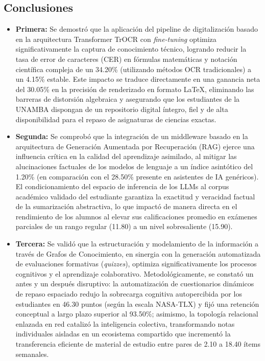 \subsection{Conclusiones}

\begin{itemize}

\item \textbf{Primera:} Se demostró que la aplicación del pipeline de digitalización basado en la arquitectura Transformer TrOCR con \textit{fine-tuning} optimiza significativamente la captura de conocimiento técnico, logrando reducir la tasa de error de caracteres (CER) en fórmulas matemáticas y notación científica compleja de un 34.20\% (utilizando métodos OCR tradicionales) a un 4.15\% estable. Este impacto se traduce directamente en una ganancia neta del 30.05\% en la precisión de renderizado en formato \LaTeX{}, eliminando las barreras de distorsión algebraica y asegurando que los estudiantes de la UNAMBA dispongan de un repositorio digital íntegro, fiel y de alta disponibilidad para el repaso de asignaturas de ciencias exactas.

\item \textbf{Segunda:} Se comprobó que la integración de un middleware basado en la arquitectura de Generación Aumentada por Recuperación (RAG) ejerce una influencia crítica en la calidad del aprendizaje asimilado, al mitigar las alucinaciones factuales de los modelos de lenguaje a un índice asintótico del 1.20\% (en comparación con el 28.50\% presente en asistentes de IA genéricos). El condicionamiento del espacio de inferencia de los LLMs al corpus académico validado del estudiante garantiza la exactitud y veracidad factual de la sumarización abstractiva, lo que impactó de manera directa en el rendimiento de los alumnos al elevar sus calificaciones promedio en exámenes parciales de un rango regular (11.80) a un nivel sobresaliente (15.90).

\item \textbf{Tercera:} Se validó que la estructuración y modelamiento de la información a través de Grafos de Conocimiento, en sinergia con la generación automatizada de evaluaciones formativas (\textit{quizzes}), optimiza significativamente los procesos cognitivos y el aprendizaje colaborativo. Metodológicamente, se constató un antes y un después disruptivo: la automatización de cuestionarios dinámicos de repaso espaciado redujo la sobrecarga cognitiva autopercibida por los estudiantes en 46.30 puntos (según la escala NASA-TLX) y fijó una retención conceptual a largo plazo superior al 93.50\%; asimismo, la topología relacional enlazada en red catalizó la inteligencia colectiva, transformando notas individuales aisladas en un ecosistema compartido que incrementó la transferencia eficiente de material de estudio entre pares de 2.10 a 18.40 ítems semanales.

\end{itemize}

